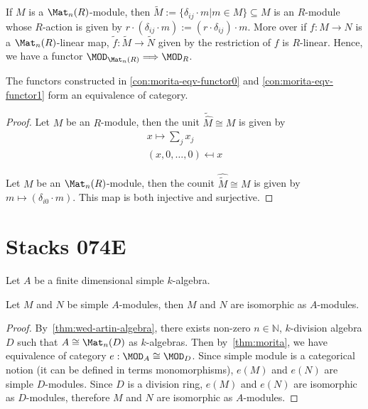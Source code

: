 \begin{construction}\label{con:morita-eqv-functor1}
  \leanok
   If $M$ is a
  $\Mat_{n}(R)$-module, then
  $\widetilde{M} := \{\delta_{ij}\cdot m | m \in M\} \subseteq M$ is an
  $R$-module whose $R$-action is given by
  $r \cdot (\delta_{ij}\cdot m) := (r\cdot \delta_{ij})\cdot m$. More over if
  $f : M \to N$ is a $\Mat_{n}(R)$-linear map,
  $\widetilde{f} : \widetilde{M} \to \widetilde{N}$ given by the restriction of
  $f$ is $R$-linear. Hence, we have a functor
  $\MOD_{\Mat_{n}(R)}\Longrightarrow \MOD_{R}$.
\end{construction}

\begin{theorem}\label{thm:morita}
  The functors constructed in \cref{con:morita-eqv-functor0} and
  \cref{con:morita-eqv-functor1} form an equivalence of category.
  \leanok
\end{theorem}

\begin{proof}
  Let $M$ be an $R$-module, then the unit $\widetilde{\widehat{M}} \cong M$ is
  given by
  \[
    \begin{aligned}
      x \mapsto \sum_{j} x_{j} \\
      (x,0,\dots,0) \mapsfrom x
    \end{aligned}
  \]

  Let $M$ be an $\Mat_{n}(R)$-module, then the counit
  $\widehat{\widetilde{M}}\cong M$ is given by $m \mapsto (\delta_{i0}\cdot m)$.
  This map is both injective and surjective.
\end{proof}

\section{Stacks 074E}\label{sec:stacks-074e}

Let $A$ be a finite dimensional simple $k$-algebra.

\begin{lemma}\label{lem:isomorphic-simple-mod}
  Let $M$ and $N$ be simple $A$-modules, then $M$ and $N$ are isomorphic as
  $A$-modules.
  \leanok
\end{lemma}

\begin{proof}
  By~\cref{thm:wed-artin-algebra}, there exists non-zero $n\in\mathbb N$,
  $k$-division algebra $D$ such that $A\cong \Mat_{n}(D)$ as $k$-algebras. Then
  by~\cref{thm:morita}, we have equivalence of category
  $e : \MOD_{A}\cong\MOD_{D}$. Since simple module is a categorical notion (it
  can be defined in terms monomorphisms), $e(M)$ and $e(N)$ are simple
  $D$-modules. Since $D$ is a division ring, $e(M)$ and $e(N)$ are isomorphic as
  $D$-modules, therefore $M$ and $N$ are isomorphic as $A$-modules.
\end{proof}

